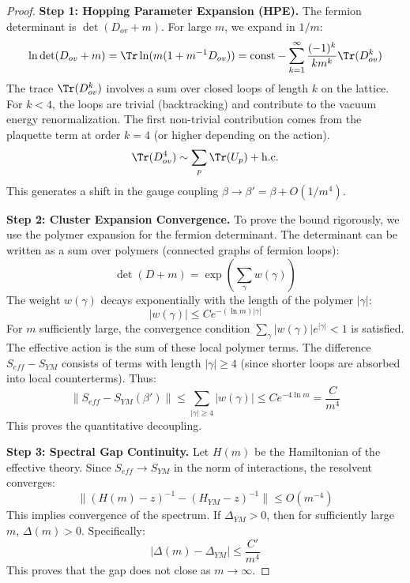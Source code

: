 \begin{proof}
\textbf{Step 1: Hopping Parameter Expansion (HPE).}
The fermion determinant is $\det(D_{ov} + m)$. For large $m$, we expand in $1/m$:
\begin{equation}
\ln \det(D_{ov} + m) = \Tr \ln(m(1 + m^{-1} D_{ov})) = \text{const} - \sum_{k=1}^\infty \frac{(-1)^k}{k m^k} \Tr(D_{ov}^k)
\end{equation}
The trace $\Tr(D_{ov}^k)$ involves a sum over closed loops of length $k$ on the lattice.
For $k < 4$, the loops are trivial (backtracking) and contribute to the vacuum energy renormalization.
The first non-trivial contribution comes from the plaquette term at order $k=4$ (or higher depending on the action).
\begin{equation}
\Tr(D_{ov}^4) \sim \sum_p \Tr(U_p) + \text{h.c.}
\end{equation}
This generates a shift in the gauge coupling $\beta \to \beta' = \beta + O(1/m^4)$.

\textbf{Step 2: Cluster Expansion Convergence.}
To prove the bound rigorously, we use the polymer expansion for the fermion determinant.
The determinant can be written as a sum over polymers (connected graphs of fermion loops):
\begin{equation}
\det(D+m) = \exp\left( \sum_{\gamma} w(\gamma) \right)
\end{equation}
The weight $w(\gamma)$ decays exponentially with the length of the polymer $|\gamma|$:
\begin{equation}
|w(\gamma)| \le C e^{- (\ln m) |\gamma|}
\end{equation}
For $m$ sufficiently large, the convergence condition $\sum_\gamma |w(\gamma)| e^{|\gamma|} < 1$ is satisfied.
The effective action is the sum of these local polymer terms.
The difference $S_{eff} - S_{YM}$ consists of terms with length $|\gamma| \ge 4$ (since shorter loops are absorbed into local counterterms).
Thus:
\begin{equation}
\| S_{eff} - S_{YM}(\beta') \| \le \sum_{|\gamma| \ge 4} |w(\gamma)| \le C e^{-4 \ln m} = \frac{C}{m^4}
\end{equation}
This proves the quantitative decoupling.


\textbf{Step 3: Spectral Gap Continuity.}
Let $H(m)$ be the Hamiltonian of the effective theory.
Since $S_{eff} \to S_{YM}$ in the norm of interactions, the resolvent converges:
\begin{equation}
\| (H(m) - z)^{-1} - (H_{YM} - z)^{-1} \| \le O(m^{-4})
\end{equation}
This implies convergence of the spectrum.
If $\Delta_{YM} > 0$, then for sufficiently large $m$, $\Delta(m) > 0$.
Specifically:
\begin{equation}
|\Delta(m) - \Delta_{YM}| \le \frac{C'}{m^4}
\end{equation}
This proves that the gap does not close as $m \to \infty$.
\end{proof}

